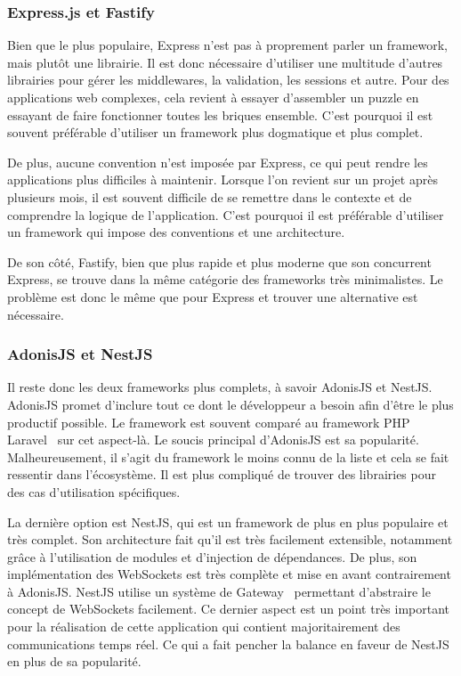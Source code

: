 \subsubsection{Express.js et Fastify}

Bien que le plus populaire, Express n'est pas à proprement parler un framework, mais plutôt une librairie. Il est donc nécessaire d'utiliser une multitude d'autres librairies pour gérer les middlewares, la validation, les sessions et autre. Pour des applications web complexes, cela revient à essayer d'assembler un puzzle en essayant de faire fonctionner toutes les briques ensemble. C'est pourquoi il est souvent préférable d'utiliser un framework plus dogmatique et plus complet.

De plus, aucune convention n'est imposée par Express, ce qui peut rendre les applications plus difficiles à maintenir. Lorsque l'on revient sur un projet après plusieurs mois, il est souvent difficile de se remettre dans le contexte et de comprendre la logique de l'application. C'est pourquoi il est préférable d'utiliser un framework qui impose des conventions et une architecture.

De son côté, Fastify, bien que plus rapide et plus moderne que son concurrent Express, se trouve dans la même catégorie des frameworks très minimalistes. Le problème est donc le même que pour Express et trouver une alternative est nécessaire.

\subsubsection{AdonisJS et NestJS}

Il reste donc les deux frameworks plus complets, à savoir AdonisJS et NestJS. AdonisJS promet d'inclure tout ce dont le développeur a besoin afin d'être le plus productif possible. Le framework est souvent comparé au framework PHP Laravel~\cite{laravel} sur cet aspect-là. Le soucis principal d'AdonisJS est sa popularité. Malheureusement, il s'agit du framework le moins connu de la liste et cela se fait ressentir dans l'écosystème. Il est plus compliqué de trouver des librairies pour des cas d'utilisation spécifiques.

La dernière option est NestJS, qui est un framework de plus en plus populaire et très complet. Son architecture fait qu'il est très facilement extensible, notamment grâce à l'utilisation de modules et d'injection de dépendances. De plus, son implémentation des WebSockets est très complète et mise en avant contrairement à AdonisJS. NestJS utilise un système de Gateway~\cite{nestjs-gateway} permettant d'abstraire le concept de WebSockets facilement.  Ce dernier aspect est un point très important pour la réalisation de cette application qui contient majoritairement des communications temps réel. Ce qui a fait pencher la balance en faveur de NestJS en plus de sa popularité.

